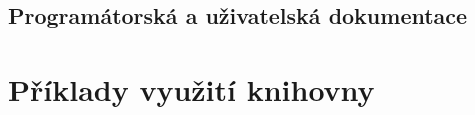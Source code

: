 	

\subsection[Dokumentace]{Programátorská a uživatelská dokumentace}

	

\section[Příklady]{Příklady využití knihovny}






